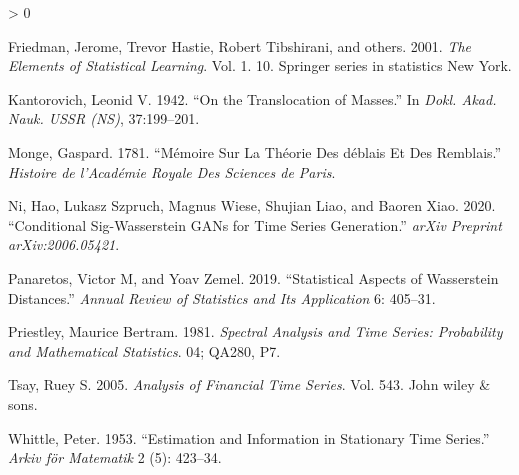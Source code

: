 \documentclass[
  11pt,
]{article}
\newlength{\cslhangindent}
\newenvironment{CSLReferences}[2] %
 {%
  \setlength{\parindent}{0pt}
  \ifodd #1 \everypar{\setlength{\hangindent}{\cslhangindent}}\ignorespaces\fi
  \ifnum #2 > 0
  \setlength{\parskip}{#2\baselineskip}
  \fi
 }%
 {}
\begin{document}
\begin{CSLReferences}{1}{0}
\leavevmode\hypertarget{ref-friedman2001elements}{}%
Friedman, Jerome, Trevor Hastie, Robert Tibshirani, and others. 2001.
\emph{The Elements of Statistical Learning}. Vol. 1. 10. Springer series
in statistics New York.

\leavevmode\hypertarget{ref-kantorovich1942translocation}{}%
Kantorovich, Leonid V. 1942. {``On the Translocation of Masses.''} In
\emph{Dokl. Akad. Nauk. USSR (NS)}, 37:199--201.

\leavevmode\hypertarget{ref-monge1781memoire}{}%
Monge, Gaspard. 1781. {``M{é}moire Sur La Th{é}orie Des d{é}blais Et Des
Remblais.''} \emph{Histoire de l'Acad{é}mie Royale Des Sciences de
Paris}.

\leavevmode\hypertarget{ref-ni2020conditional}{}%
Ni, Hao, Lukasz Szpruch, Magnus Wiese, Shujian Liao, and Baoren Xiao.
2020. {``Conditional Sig-Wasserstein GANs for Time Series Generation.''}
\emph{arXiv Preprint arXiv:2006.05421}.

\leavevmode\hypertarget{ref-panaretos2019statistical}{}%
Panaretos, Victor M, and Yoav Zemel. 2019. {``Statistical Aspects of
Wasserstein Distances.''} \emph{Annual Review of Statistics and Its
Application} 6: 405--31.

\leavevmode\hypertarget{ref-priestley1981spectral}{}%
Priestley, Maurice Bertram. 1981. \emph{Spectral Analysis and Time
Series: Probability and Mathematical Statistics}. 04; QA280, P7.

\leavevmode\hypertarget{ref-tsay2005analysis}{}%
Tsay, Ruey S. 2005. \emph{Analysis of Financial Time Series}. Vol. 543.
John wiley \& sons.

\leavevmode\hypertarget{ref-whittle1953estimation}{}%
Whittle, Peter. 1953. {``Estimation and Information in Stationary Time
Series.''} \emph{Arkiv f{ö}r Matematik} 2 (5): 423--34.

\end{CSLReferences}
\end{document}

